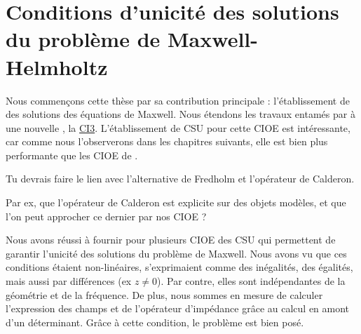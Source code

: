 \chapter[Unicité des solutions de Maxwell]{Conditions d'unicité des solutions du problème de Maxwell-Helmholtz}
\label{sec:csu}
\minitoc
\newpage
{}
Nous commençons cette thèse par sa contribution principale : l'établissement de  des solutions des équations de Maxwell.
Nous étendons les travaux entamés par \cite{stupfel_sufficient_2011} à une nouvelle , la \hyperlink{ci3}{CI3}. L'établissement de CSU pour cette CIOE est intéressante, car comme nous l'observerons dans les chapitres suivants, elle est bien plus performante que les CIOE de \cite{stupfel_sufficient_2011}.





\begin{REM}
  Tu devrais faire le lien avec l'alternative de Fredholm et l'opérateur de Calderon.
\end{REM}
\begin{REP}
  Par ex, que l'opérateur de Calderon est explicite sur des objets modèles, et que l'on peut approcher ce dernier par nos CIOE ?
\end{REP}
Nous avons réussi à fournir pour plusieurs CIOE des CSU qui permettent de garantir l'unicité des solutions du problème de Maxwell. Nous avons vu que ces conditions étaient non-linéaires, s'exprimaient comme des inégalités, des égalités, mais aussi par différences (ex \(z\not=0\)). Par contre, elles sont indépendantes de la géométrie et de la fréquence.
De plus, nous sommes en mesure de calculer l'expression des champs et de l'opérateur d'impédance grâce au calcul en amont d'un déterminant. Grâce à cette condition, le problème est bien posé.